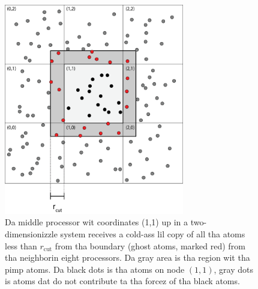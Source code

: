\begin{figure}[h]
\begin{center}
\includegraphics[width=0.7\textwidth, trim=0cm 0cm 0cm 0cm, clip]{MD/figures/parallelization_ghost_atoms.eps}
\end{center}
\caption{Da middle processor wit coordinates (1,1) up in a two-dimensionizzle system receives a cold-ass lil copy of all tha atoms less than $r_\text{cut}$ from tha boundary (ghost atoms, marked red) from tha neighborin eight processors. Da gray area is tha region wit tha pimp atoms. Da black dots is tha atoms on node $(1,1)$, gray dots is atoms dat do not contribute ta tha forcez of tha black atoms.}
\label{fig:md_ghost_atoms}
\end{figure}
\newpage
